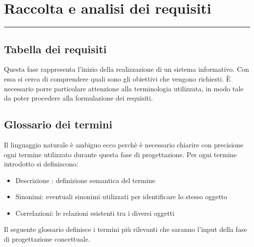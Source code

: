 \documentclass[legalpaper]{article}
\begin{document}
\newpage
\section{Raccolta e analisi dei requisiti}
\rule{\linewidth}{1.5pt}
\subsection{Tabella dei requisiti}
Questa fase rappresenta l’inizio della realizzazione di un sistema informativo. Con essa si cerca di comprendere quali sono gli obiettivi che vengono richiesti. 
È necessario porre particolare attenzione alla terminologia utilizzata, in modo tale da poter procedere alla formulazione dei requisiti.

\subsection{Glossario dei termini}
Il linguaggio naturale è ambiguo ecco perchè è necessario chiarire con precisione ogni termine utilizzato durante questa fase di progettazione.
Per ogni termine introdotto si definiscono:
\begin{itemize}
    \item Descrizione : definizione semantica del termine
    \item Sinonimi: eventuali sinonimi utilizzati per identificare lo stesso oggetto
    \item Correlazioni: le relazioni esistenti tra i diversi oggetti
\end{itemize}
\medskip
Il seguente glossario definisce i termini più rilevanti che saranno l’input della fase di progettazione concettuale.
\medskip
\end{document}
